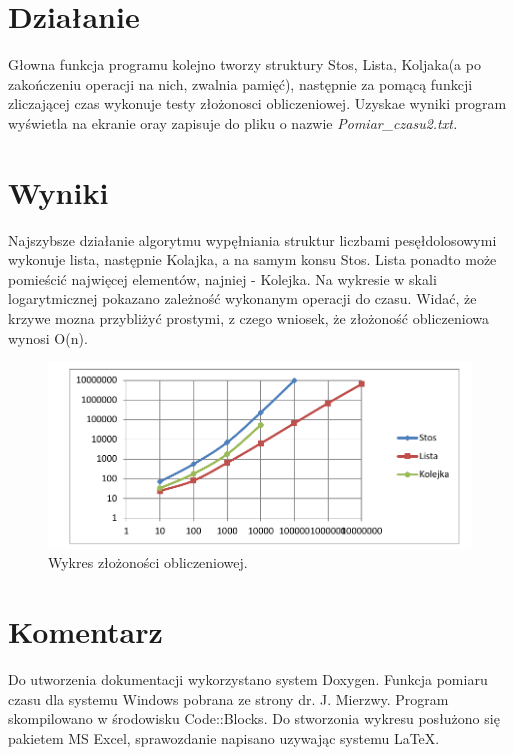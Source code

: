 \documentclass[twoside]{article}
\newcommand{\+}{\discretionary{\mbox{\scriptsize$\hookleftarrow$}}{}{}}
\begin{document}
	\section{Działanie}
	Głowna funkcja programu kolejno tworzy struktury Stos, Lista, Koljaka(a po zakończeniu operacji na nich, zwalnia pamięć), następnie za pomącą funkcji zliczającej czas wykonuje testy złożonosci obliczeniowej. Uzyskae wyniki program wyświetla na ekranie oray zapisuje do pliku o nazwie \textsl{Pomiar\_czasu2.txt.}
	\section{Wyniki}
	Najszybsze działanie algorytmu wypęłniania struktur liczbami pesęłdolosowymi wykonuje lista, następnie Kolajka, a na samym konsu Stos. Lista ponadto może pomieścić najwięcej elementów, najniej - Kolejka. Na wykresie w skali logarytmicznej pokazano zależność wykonanym operacji do czasu. Widać, że krzywe mozna przybliżyć prostymi, z czego wniosek, że złożoność obliczeniowa wynosi O(n).  
	 \begin{figure}
	 	\centering
		\includegraphics[width=14cm]{Wykres.pdf}
		\caption{Wykres złożoności obliczeniowej.}
	 \end{figure}
	 \section{Komentarz}
	 	Do utworzenia dokumentacji wykorzystano system Doxygen.
	 	Funkcja pomiaru czasu dla systemu Windows pobrana ze strony dr. J. Mierzwy. Program skompilowano w środowisku Code::Blocks. Do stworzonia wykresu posłużono się pakietem MS Excel, sprawozdanie napisano uzywając systemu \LaTeX.
\end{document}
